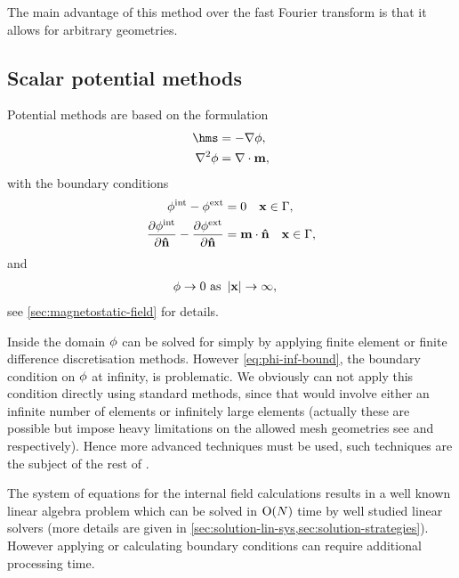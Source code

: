 The main advantage of this method over the fast Fourier transform is that it allows for arbitrary geometries.


\subsection{Scalar potential methods}
\label{sec:magstat-field-calc-pote}

Potential methods are based on the formulation
\begin{equation}
  \begin{aligned}
    \label{eq:Hms2}
    \hms &= - \grad \phim, \\
    \lap \phim &= \div \mv,
  \end{aligned}
\end{equation}
with the boundary conditions
\begin{equation}
  \begin{aligned}
    \label{eq:cont-phi-bound2}
    \phi^{\mathrm{int}} - \phi^{\mathrm{ext}} &= 0 \quad \boldsymbol{\mathrm{x}} \in {\Gamma}, \\
    \frac{\partial \phi^{\mathrm{int}}}{\partial \boldsymbol{\mathrm{\hat{n}}}} - \frac{\partial \phi^{\mathrm{ext}}}{\partial \boldsymbol{\mathrm{\hat{n}}}} &= \boldsymbol{\mathrm{m}} \cdot \boldsymbol{\mathrm{\hat{n}}} \quad \boldsymbol{\mathrm{x}} \in {\Gamma}, \\
  \end{aligned}
\end{equation}
and
\begin{equation}
  \begin{aligned}
    \label{eq:phi-inf-bound}
    \phi \rightarrow 0 \text{ as } &\left|{\boldsymbol{\mathrm{x}}} \right| \rightarrow \infty,
  \end{aligned}
\end{equation}
see \cref{sec:magnetostatic-field} for details.

Inside the domain $\phi$ can be solved for simply by applying finite element or finite difference discretisation methods.
However \cref{eq:phi-inf-bound}, the boundary condition on $\phi$ at infinity, is problematic.
We obviously can not apply this condition directly using standard methods, since that would involve either an infinite number of elements or infinitely large elements (actually these are  possible but impose heavy limitations on the allowed mesh geometries see \eg \cite{Alouges2001} and \cite{Fidler2000} respectively).
Hence more advanced techniques must be used, such techniques are the subject of the rest of .

The system of equations for the internal field calculations results in a well known linear algebra problem which can be solved in $\mathrm{O}{\left( N \right)}$ time by well studied linear solvers (more details are given in \cref{sec:solution-lin-sys,sec:solution-strategies}).
However applying or calculating boundary conditions can require additional processing time.



